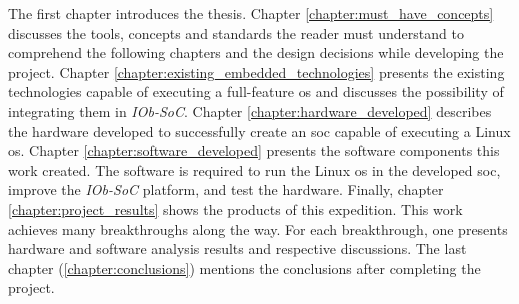 The first chapter introduces the thesis. Chapter \ref{chapter:must_have_concepts} discusses the tools, concepts and standards the reader must understand to comprehend the following chapters and the design decisions while developing the project. Chapter \ref{chapter:existing_embedded_technologies} presents the existing technologies capable of executing a full-feature \acrshort{os} and discusses the possibility of integrating them in \textit{IOb-SoC}. Chapter \ref{chapter:hardware_developed} describes the hardware developed to successfully create an \acrshort{soc} capable of executing a Linux \acrshort{os}. Chapter \ref{chapter:software_developed} presents the software components this work created. The software is required to run the Linux \acrshort{os} in the developed \acrshort{soc}, improve the \textit{IOb-SoC} platform, and test the hardware. Finally, chapter \ref{chapter:project_results} shows the products of this expedition. This work achieves many breakthroughs along the way. For each breakthrough, one presents hardware and software analysis results and respective discussions. The last chapter (\ref{chapter:conclusions}) mentions the conclusions after completing the project.
